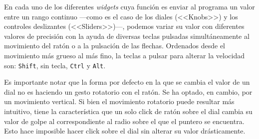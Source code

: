 En cada uno de los diferentes \textit{widgets} cuya función es enviar al programa un valor entre un rango continuo ---como es el caso de los diales (<<Knobs>>) y los controles deslizantes (<<Sliders>>)---, podemos variar su valor con diferentes valores de precisión con la ayuda de diversas teclas pulsadas simultáneamente al movimiento del ratón o a la pulsación de las flechas. Ordenados desde el movimiento más grueso al más fino, la teclas a pulsar para alterar la velocidad son: \texttt{Shift}, sin tecla, \texttt{Ctrl} y \texttt{Alt}.

Es importante notar que la forma por defecto en la que se cambia el valor de un dial no es haciendo un gesto rotatorio con el ratón. Se ha optado, en cambio, por un movimiento vertical. Si bien el movimiento rotatorio puede resultar más intuitivo, tiene la característica que un solo click de ratón sobre el dial cambia su valor de golpe al correspondiente al radio sobre el que el puntero se encuentra. Esto hace imposible hacer click sobre el dial sin alterar su valor drásticamente.
